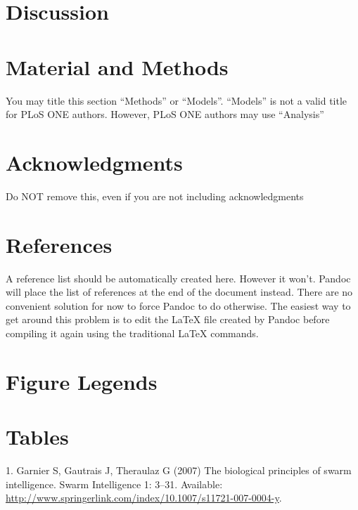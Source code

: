 \documentclass[10pt]{article}
\begin{document}
\section*{Discussion}\label{discussion}

\section*{Material and Methods}\label{material-and-methods}

You may title this section ``Methods'' or ``Models''. ``Models'' is not
a valid title for PLoS ONE authors. However, PLoS ONE authors may use
``Analysis''

\section*{Acknowledgments}\label{acknowledgments}

Do NOT remove this, even if you are not including acknowledgments

\section*{References}\label{references}

A reference list should be automatically created here. However it won't.
Pandoc will place the list of references at the end of the document
instead. There are no convenient solution for now to force Pandoc to do
otherwise. The easiest way to get around this problem is to edit the
LaTeX file created by Pandoc before compiling it again using the
traditional LaTeX commands.

\section*{Figure Legends}\label{figure-legends}

\section*{Tables}\label{tables}

1. Garnier S, Gautrais J, Theraulaz G (2007) The biological principles
of swarm intelligence. Swarm Intelligence 1: 3--31. Available:
\url{http://www.springerlink.com/index/10.1007/s11721-007-0004-y}.
\end{document}
